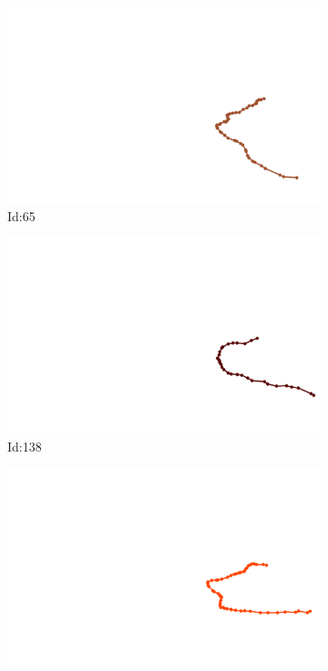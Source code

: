 \documentclass[12pt,twoside]{report}
\begin{document}
\begin{figure}
\centering
\begin{subfigure}[b]{0.20\textwidth}
\centering
\includegraphics[width=\textwidth]{../../trajectories/65.png}
\caption{Id:65}
\end{subfigure}
\begin{subfigure}[b]{0.20\textwidth}
\centering
\includegraphics[width=\textwidth]{../../trajectories/138.png}
\caption{Id:138}
\end{subfigure}
\begin{subfigure}[b]{0.20\textwidth}
\centering
\includegraphics[width=\textwidth]{../../trajectories/181.png}

\end{subfigure}
\end{figure}
\end{document}
